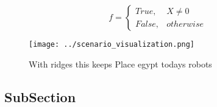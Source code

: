 \documentclass[a4paper]{article}
\begin{document}
\begin{equation}   f =
\begin{cases} True, & X \neq 0\\
False, & otherwise
\end{cases}
\end{equation}

\begin{figure}
\centering
\texttt{[image: ../scenario\_visualization.png]}
\caption{With ridges this keeps Place egypt todays robots 
}
\end{figure}
 
\subsection{SubSection}
\end{document}
